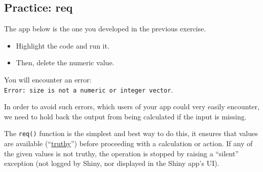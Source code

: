\documentclass[
  letterpaper,
  DIV=11,
  numbers=noendperiod]{scrreprt}
\newenvironment{Shaded}{\begin{snugshade}}{\end{snugshade}}
\newcommand{\AttributeTok}[1]{\textcolor[rgb]{0.40,0.46,0.14}{#1}}
\newcommand{\CommentTok}[1]{\textcolor[rgb]{0.37,0.37,0.37}{#1}}
\newcommand{\ConstantTok}[1]{\textcolor[rgb]{0.56,0.35,0.01}{#1}}
\newcommand{\ControlFlowTok}[1]{\textcolor[rgb]{0.00,0.46,0.62}{#1}}
\newcommand{\DecValTok}[1]{\textcolor[rgb]{0.68,0.00,0.00}{#1}}
\newcommand{\FunctionTok}[1]{\textcolor[rgb]{0.28,0.35,0.67}{#1}}
\newcommand{\NormalTok}[1]{\textcolor[rgb]{0.00,0.46,0.62}{#1}}
\newcommand{\OtherTok}[1]{\textcolor[rgb]{0.00,0.46,0.62}{#1}}
\newcommand{\SpecialCharTok}[1]{\textcolor[rgb]{0.37,0.37,0.37}{#1}}
\providecommand{\tightlist}{%
  \setlength{\itemsep}{0pt}\setlength{\parskip}{0pt}}
\begin{document}
\begin{Shaded}
\end{Shaded}

\hypertarget{practice-req}{%
\subsection{Practice: req}\label{practice-req}}

The app below is the one you developed in the previous exercise.

\begin{itemize}
\tightlist
\item
  Highlight the code and run it.
\item
  Then, delete the numeric value.
\end{itemize}

You will encounter an error:
\texttt{Error:\ size\ is\ not\ a\ numeric\ or\ integer\ vector}.

In order to avoid such errors, which users of your app could very easily
encounter, we need to hold back the output from being calculated if the
input is missing.

The \texttt{req()} function is the simplest and best way to do this, it
ensures that values are available
(``\href{https://shiny.rstudio.com/reference/shiny/latest/req.html}{truthy}'')
before proceeding with a calculation or action. If any of the given
values is not truthy, the operation is stopped by raising a ``silent''
exception (not logged by Shiny, nor displayed in the Shiny app's UI).
\end{document}
